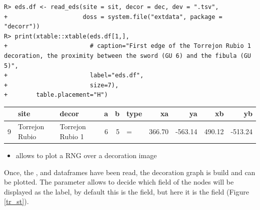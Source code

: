 \documentclass[article]{jss}\usepackage{knitr}
\begin{document}
\begin{kframe}
\begin{verbatim}
R> eds.df <- read_eds(site = sit, decor = dec, dev = ".tsv",
+                     doss = system.file("extdata", package = "decorr"))
R> print(xtable::xtable(eds.df[1,],
+                       # caption="First edge of the Torrejon Rubio 1 decoration, the proximity between the sword (GU 6) and the fibula (GU 5)",
+                       label="eds.df",
+                       size=7),
+        table.placement="H")
\end{verbatim}
\end{kframe}%
\begin{table}[H]
\centering
\begin{tabular}{rllrrlrrrr}
  \hline
 & site & decor & a & b & type & xa & ya & xb & yb \\ 
  \hline
9 & Torrejon Rubio & Torrejon Rubio 1 &   6 &   5 & = & 366.70 & -563.14 & 490.12 & -513.24 \\ 
   \hline
\end{tabular}
\label{eds.df}
\end{table}


\begin{itemize}
\setlength\itemsep{.1em}
  \item {} allows to plot a RNG over a decoration image
\end{itemize}

Once, the ,  and  dataframes have been read, the decoration graph is build and can be plotted. The  parameter allows to decide which field of the nodes will be displayed as the label, by default this is the  field, but here it is the  field (Figure \ref{tr_st}).
\end{document}
